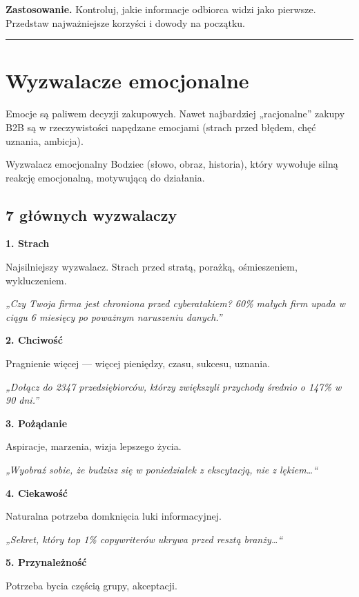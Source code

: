 \documentclass[
  12pt,
  a4paper,
  twoside,
  openright,
  12pt,
  DIV=12,
  BCOR=12mm]{scrbook}
\newcommand{\decoline}{%
  \begin{center}
    \textcolor{bordergray}{\rule{0.3\textwidth}{0.5pt}}
  \end{center}
}
\begin{document}
\textbf{Zastosowanie.} Kontroluj, jakie informacje odbiorca widzi jako
pierwsze. Przedstaw najważniejsze korzyści i dowody na początku.

\decoline

\section{Wyzwalacze emocjonalne}\label{wyzwalacze-emocjonalne}

Emocje są paliwem decyzji zakupowych. Nawet najbardziej „racjonalne''
zakupy B2B są w rzeczywistości napędzane emocjami (strach przed błędem,
chęć uznania, ambicja).

\begin{pojecie}{Wyzwalacz emocjonalny}
Bodziec (słowo, obraz, historia), który wywołuje silną reakcję emocjonalną, motywującą do działania.
\end{pojecie}

\subsection{7 głównych wyzwalaczy}\label{gux142uxf3wnych-wyzwalaczy}

\textbf{1. Strach}

Najsilniejszy wyzwalacz. Strach przed stratą, porażką, ośmieszeniem,
wykluczeniem.

\emph{„Czy Twoja firma jest chroniona przed cyberatakiem? 60\% małych
firm upada w ciągu 6 miesięcy po poważnym naruszeniu danych.''}

\textbf{2. Chciwość}

Pragnienie więcej --- więcej pieniędzy, czasu, sukcesu, uznania.

\emph{„Dołącz do 2347 przedsiębiorców, którzy zwiększyli przychody
średnio o 147\% w 90 dni.''}

\textbf{3. Pożądanie}

Aspiracje, marzenia, wizja lepszego życia.

\emph{„Wyobraź sobie, że budzisz się w poniedziałek z ekscytacją, nie z
lękiem\ldots``}

\textbf{4. Ciekawość}

Naturalna potrzeba domknięcia luki informacyjnej.

\emph{„Sekret, który top 1\% copywriterów ukrywa przed resztą
branży\ldots``}

\textbf{5. Przynależność}

Potrzeba bycia częścią grupy, akceptacji.
\end{document}
